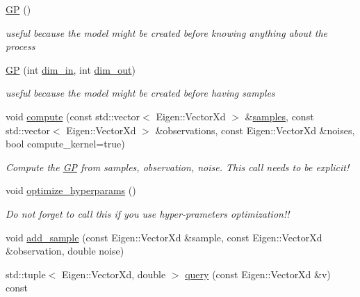 \begin{DoxyCompactItemize}
\item 
\hyperlink{classlimbo_1_1model_1_1_g_p_aa18de82f231f3aed6ce8cce4c778aedb}{G\+P} ()
\begin{DoxyCompactList}\small\item\em useful because the model might be created before knowing anything about the process \end{DoxyCompactList}\item 
\hyperlink{classlimbo_1_1model_1_1_g_p_ab36947c89e4f5ad92599656a21829755}{G\+P} (int \hyperlink{classlimbo_1_1model_1_1_g_p_a41d99e6a69d53fc7d9260d295f787bc3}{dim\+\_\+in}, int \hyperlink{classlimbo_1_1model_1_1_g_p_a077144695f9f0b33b64d4feb8fb4e447}{dim\+\_\+out})
\begin{DoxyCompactList}\small\item\em useful because the model might be created before having samples \end{DoxyCompactList}\item 
void \hyperlink{classlimbo_1_1model_1_1_g_p_a6ba14232cd8d845874b03037f19a740a}{compute} (const std\+::vector$<$ Eigen\+::\+Vector\+Xd $>$ \&\hyperlink{classlimbo_1_1model_1_1_g_p_abaa15a2e503bac670dd1a35fb377aa23}{samples}, const std\+::vector$<$ Eigen\+::\+Vector\+Xd $>$ \&observations, const Eigen\+::\+Vector\+Xd \&noises, bool compute\+\_\+kernel=true)
\begin{DoxyCompactList}\small\item\em Compute the \hyperlink{classlimbo_1_1model_1_1_g_p}{G\+P} from samples, observation, noise. This call needs to be explicit! \end{DoxyCompactList}\item 
void \hyperlink{classlimbo_1_1model_1_1_g_p_aa01b41e37de4def676cf6c79b08aac94}{optimize\+\_\+hyperparams} ()
\begin{DoxyCompactList}\small\item\em Do not forget to call this if you use hyper-\/prameters optimization!! \end{DoxyCompactList}\item 
void \hyperlink{classlimbo_1_1model_1_1_g_p_a43e4e23d98c421d610df52ea6d3f3539}{add\+\_\+sample} (const Eigen\+::\+Vector\+Xd \&sample, const Eigen\+::\+Vector\+Xd \&observation, double noise)
\item 
std\+::tuple$<$ Eigen\+::\+Vector\+Xd, double $>$ \hyperlink{classlimbo_1_1model_1_1_g_p_a33937ff7df97c01fdd9bf8911e0a6159}{query} (const Eigen\+::\+Vector\+Xd \&v) const 
\item 

\end{DoxyCompactItemize}

